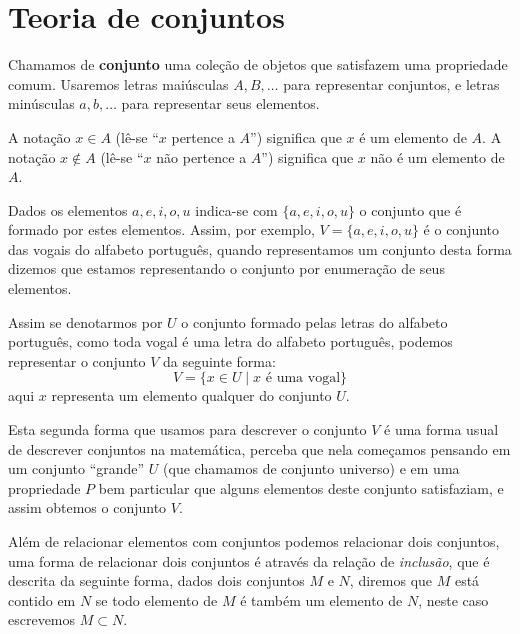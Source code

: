 
\chapter{Teoria de conjuntos}


Chamamos de \textbf{conjunto} uma coleção de objetos que satisfazem uma propriedade comum. Usaremos letras maiúsculas $A, B, \ldots$ para representar  conjuntos, e letras minúsculas $a, b, \ldots$ para representar seus elementos.

A notação $x \in A$ (lê-se ``$x$ pertence a $A$'') significa que $x$ é um elemento de $A$. A notação $x \notin A$ (lê-se ``$x$ não pertence a $A$'') significa que $x$ não é um elemento de $A$.

Dados os elementos $a, e, i, o, u$ indica-se com $\{a, e, i, o, u\}$ o conjunto que é formado por estes elementos. Assim, por exemplo, $V= \{a, e, i, o, u\}$ é o conjunto das vogais do alfabeto português, quando representamos um conjunto desta forma dizemos que estamos representando o conjunto por enumeração de seus elementos.

Assim se denotarmos por $U$ o conjunto formado pelas letras do alfabeto português, como toda vogal é uma letra do alfabeto português, podemos representar o conjunto $V$ da seguinte forma:
\[V= \{x \in U \mid x \text{ é uma vogal}\}\]
aqui $x$ representa um elemento qualquer do conjunto $U$.

Esta segunda forma que usamos para descrever o conjunto $V$ é uma forma usual de descrever conjuntos na matemática, perceba que nela começamos pensando em um conjunto ``grande'' $U$ (que chamamos de conjunto universo) e em uma propriedade $P$ bem particular que alguns elementos deste conjunto satisfaziam, e assim obtemos o conjunto $V$.

Além de relacionar elementos com conjuntos podemos relacionar dois conjuntos, uma forma de relacionar dois conjuntos é através da relação de \textit{inclusão}, que é descrita da seguinte forma, dados dois conjuntos $M$ e $N$, diremos que $M$ está contido em $N$ se todo elemento de $M$ é também um elemento de $N$, neste caso escrevemos $M \subset N$.

